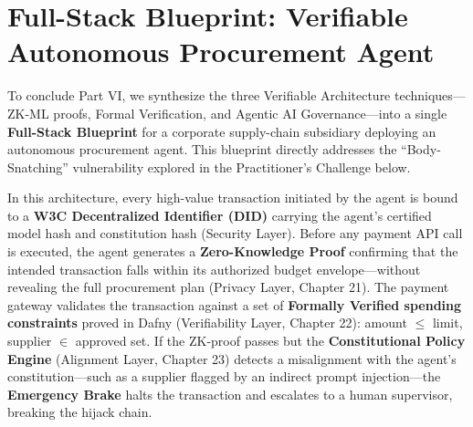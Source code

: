 \section{Full-Stack Blueprint: Verifiable Autonomous Procurement Agent}
\label{sec:blueprint_procurement_agent}

To conclude Part VI, we synthesize the three Verifiable Architecture techniques---ZK-ML proofs, Formal Verification, and Agentic AI Governance---into a single \textbf{Full-Stack Blueprint} for a corporate supply-chain subsidiary deploying an autonomous procurement agent. This blueprint directly addresses the ``Body-Snatching'' vulnerability explored in the Practitioner's Challenge below.

In this architecture, every high-value transaction initiated by the agent is bound to a \textbf{W3C Decentralized Identifier (DID)} carrying the agent's certified model hash and constitution hash (Security Layer). Before any payment API call is executed, the agent generates a \textbf{Zero-Knowledge Proof} confirming that the intended transaction falls within its authorized budget envelope---without revealing the full procurement plan (Privacy Layer, Chapter 21). The payment gateway validates the transaction against a set of \textbf{Formally Verified spending constraints} proved in Dafny (Verifiability Layer, Chapter 22): amount $\leq$ limit, supplier $\in$ approved set. If the ZK-proof passes but the \textbf{Constitutional Policy Engine} (Alignment Layer, Chapter 23) detects a misalignment with the agent's constitution---such as a supplier flagged by an indirect prompt injection---the \textbf{Emergency Brake} halts the transaction and escalates to a human supervisor, breaking the hijack chain.

